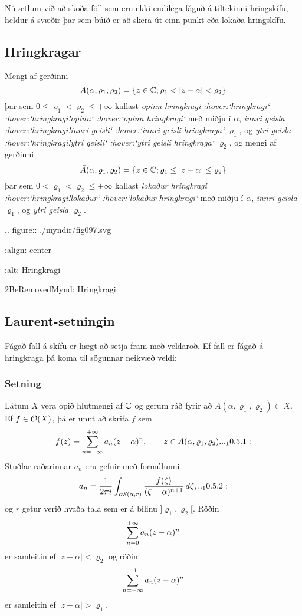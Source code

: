 Nú ætlum við að skoða föll sem eru ekki endilega fáguð á tiltekinni
hringskífu, heldur á svæðir þar sem búið er að skera út einn punkt
eða lokaða hringskífu.

\subsection*{Hringkragar}

Mengi af gerðinni 
$$A(\alpha,\varrho_1,\varrho_2)=\{z\in \C;
\varrho_1<|z-\alpha|<\varrho_2\}
$$ 
þar sem
$0\leq\varrho_1<\varrho_2\leq +\infty$
kallast {\it opinn hringkragi :hover:`hringkragi`
 :hover:`hringkragi!opinn` :hover:`opinn hringkragi`}
með miðju í $\alpha$, {\it innri geisla :hover:`hringkragi!innri
geisli` :hover:`innri geisli hringkraga`}
$\varrho_1$, og {\it ytri geisla :hover:`hringkragi!ytri
geisli` :hover:`ytri geisli hringkraga` $\varrho_2$},
og mengi af gerðinni 
$$\bar A(\alpha,\varrho_1,\varrho_2)=\{z\in {\mathbb C};
\varrho_1\leq|z-\alpha|\leq\varrho_2\}
$$ þar sem
$0<\varrho_1<\varrho_2\leq +\infty$
kallast {\it lokaður hringkragi :hover:`hringkragi!lokaður` :hover:`lokaður
hringkragi`} með miðju í $\alpha$, {\it innri geisla}
$\varrho_1$, og {\it ytri geisla $\varrho_2$}.

.. figure:: ./myndir/fig097.svg

    :align: center

    :alt: Hringkragi

    2BeRemovedMynd: Hringkragi


\subsection*{Laurent-setningin}
 
Fágað fall á skífu er hægt að setja fram með veldaröð.  
Ef fall er fágað á hringkraga þá koma til sögunnar neikvæð veldi:

\subsubsection{Setning}
Látum $X$ vera opið hlutmengi af ${\mathbb C}$ og gerum ráð fyrir að
$A(\alpha,\varrho_1,\varrho_2)\subset X$.  Ef
$f\in {\cal O}(X)$, þá er unnt að skrifa $f$ sem
 \begin{equation*}f(z)=\sum_{n=-\infty}\sp{+\infty}a_n(z-\alpha)\sp n, \qquad z\in
A(\alpha,\varrho_1,\varrho_2).


.. _10.5.1:

 \end{equation*}
Stuðlar raðarinnar $a_n$ eru gefnir með formúlunni
 \begin{equation*}a_n=\dfrac 1{2\pi i}\int_{\partial S(\alpha,r)} \dfrac{f(\zeta)}
{(\zeta-\alpha)\sp{n+1}} \, d\zeta,


.. _10.5.2:

 \end{equation*}
og $r$ getur verið hvaða tala sem er á bilinu
$]\varrho_1,\varrho_2[$.  Röðin
$$\sum_{n=0}\sp{+\infty}a_n(z-\alpha)\sp n$$ 
er samleitin ef
$|z-\alpha|<\varrho_2$ og  röðin
$$\sum_{n=-\infty}\sp{-1}a_n(z-\alpha)\sp n$$ 
er samleitin ef
$|z-\alpha|>\varrho_1$.



